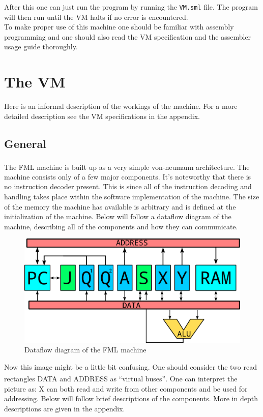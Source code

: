 \documentclass{article}
\newcommand{\V}{\verb}
\begin{document}
After this one can just run the program by running the \V+VM.sml+ file. The
program will then run until the VM halts if no error is encountered.
\\
To make proper use of this machine one should be familiar with assembly
programming and one should also read the VM specification and the assembler
usage guide thoroughly.

\section{The VM}
Here is an informal description of the workings of the machine. For a more
detailed description see the VM specifications in the appendix.
\subsection{General}

The FML machine is built up as a very simple von-neumann
architecture\textsuperscript{\cite{neuman}}. The machine consists only of a few
major components. It's noteworthy that there is no instruction decoder present.
This is since all of the instruction decoding
and handling takes place within the software implementation of the machine.
The size of the memory the machine has available is arbitrary and is defined at
the initialization of the machine. Below will follow a dataflow diagram of the
machine, describing all of the components and how they can communicate.

\begin{figure}[H]
\includegraphics[width=\textwidth,height=\textheight,keepaspectratio]{Dataflow.png}
\caption{Dataflow diagram of the FML machine}
\end{figure}

Now this image might be a little bit confusing. One should consider the two read
rectangles DATA and ADDRESS as ``virtual buses''\textsuperscript{\cite{bus}}.
One can interpret the picture as: X can both read and write from other components and be used for addressing.
Below will follow brief descriptions of the components. More in depth
descriptions are given in the appendix.
\end{document}
